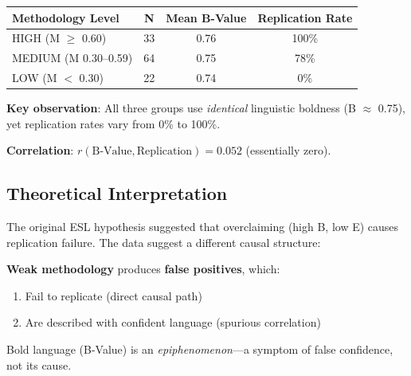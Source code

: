 \documentclass[11pt,a4paper]{article}
\begin{document}
\begin{empiricalbox}[title={B-Value Does Not Predict Replication}]
\begin{center}
\begin{tabular}{lccc}
\toprule
\textbf{Methodology Level} & \textbf{N} & \textbf{Mean B-Value} & \textbf{Replication Rate} \\
\midrule
HIGH (M $\geq$ 0.60) & 33 & 0.76 & 100\% \\
MEDIUM (M 0.30--0.59) & 64 & 0.75 & 78\% \\
LOW (M $<$ 0.30) & 22 & 0.74 & 0\% \\
\bottomrule
\end{tabular}
\end{center}

\textbf{Key observation}: All three groups use \textit{identical} linguistic boldness (B $\approx$ 0.75), yet replication rates vary from 0\% to 100\%.

\textbf{Correlation}: $r(\text{B-Value}, \text{Replication}) = 0.052$ (essentially zero).
\end{empiricalbox}

\subsection{Theoretical Interpretation}

\begin{keyinsight}[title={Language is a Symptom, Not the Cause}]
The original ESL hypothesis suggested that overclaiming (high B, low E) causes replication failure. The data suggest a different causal structure:

\begin{center}
\end{center}

\textbf{Weak methodology} produces \textbf{false positives}, which:
\begin{enumerate}
    \item Fail to replicate (direct causal path)
    \item Are described with confident language (spurious correlation)
\end{enumerate}

Bold language (B-Value) is an \textit{epiphenomenon}---a symptom of false confidence, not its cause.
\end{keyinsight}
\end{document}
